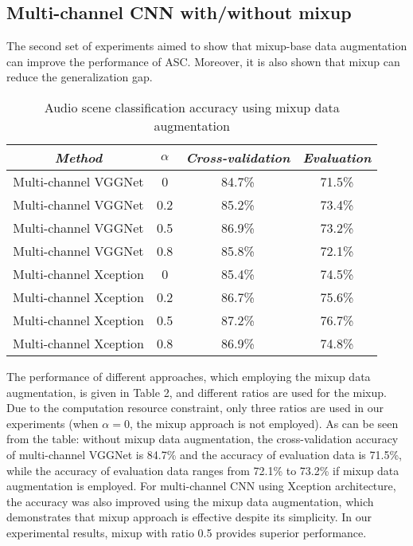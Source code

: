 \documentclass[conference]{IEEEtran}
\begin{document}
\subsection{Multi-channel CNN with/without mixup}

The second set of experiments aimed to show that mixup-base data augmentation can improve the performance of ASC. Moreover, it is also shown that mixup can reduce the generalization gap.

\begin{table}[htbp]
	\caption{Audio scene classification accuracy using mixup data augmentation}
	\begin{center}
		\begin{tabular}{|c|c|c|c|}
			\cline{1-4} 
			\textbf{\textit{Method}} & \textit{$\alpha$}&  \textbf{\textit{Cross-validation}}& \textbf{\textit{Evaluation}} \\
			\hline
			Multi-channel VGGNet & 0   & 84.7\%  & 71.5\%  \\
			Multi-channel VGGNet & 0.2 & 85.2\%  & 73.4\%  \\
			Multi-channel VGGNet & 0.5 & 86.9\%  & 73.2\%  \\
			Multi-channel VGGNet & 0.8 & 85.8\%  & 72.1\%  \\
			Multi-channel Xception & 0 & 85.4\%  & 74.5\%  \\
			Multi-channel Xception & 0.2 & 86.7\%  & 75.6\%  \\
			Multi-channel Xception & 0.5 & 87.2\%  & 76.7\%  \\
			Multi-channel Xception & 0.8 & 86.9\%  & 74.8\%  \\
			\hline
		\end{tabular}
		\label{tab2}
	\end{center}
\end{table}

The performance of different approaches, which employing the mixup data augmentation, is given in Table 2, and different ratios are used for the mixup. Due to the computation resource constraint, only three ratios are used in our experiments (when $\alpha = 0$, the mixup approach is not employed). As can be seen from the table: without mixup data augmentation, the cross-validation accuracy of multi-channel VGGNet is 84.7\% and the accuracy of evaluation data is 71.5\%, while the accuracy of evaluation data ranges from 72.1\% to 73.2\% if mixup data augmentation is employed. For multi-channel CNN using Xception architecture, the accuracy was also improved using the mixup data augmentation, which demonstrates that mixup approach is effective despite its simplicity. In our experimental results, mixup with ratio 0.5 provides superior performance.
\end{document}
